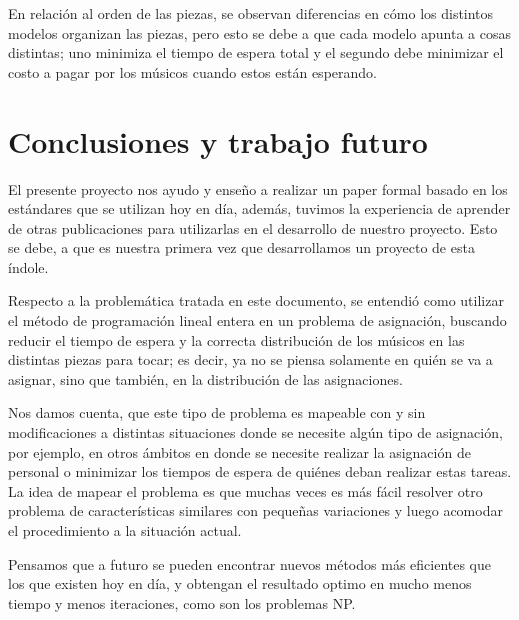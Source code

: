 \documentclass[journal, 10pt]{IEEEtran}
\begin{document}
	En relación al orden de las piezas, se observan diferencias en cómo los distintos modelos organizan las piezas, pero esto se debe a que cada modelo apunta a cosas distintas; uno minimiza el tiempo de espera total y el segundo debe minimizar el costo a pagar por los músicos cuando estos están esperando.


\section{Conclusiones y trabajo futuro}

El presente proyecto nos ayudo y enseño a realizar un paper formal basado en los estándares que se utilizan hoy en día, además, tuvimos la experiencia de aprender de otras publicaciones para utilizarlas en el desarrollo de nuestro proyecto. Esto se debe, a que es nuestra primera vez que desarrollamos un proyecto de esta índole.

Respecto a la problemática tratada en este documento, se entendió como utilizar el método de programación lineal entera en un problema de asignación, buscando reducir el tiempo de espera y la correcta distribución de los músicos en las distintas piezas para tocar; es decir, ya no se piensa solamente en quién se va a asignar, sino que también, en la distribución de las asignaciones.

Nos damos cuenta, que este tipo de problema es mapeable con y sin modificaciones a distintas situaciones donde se necesite algún tipo de asignación, por ejemplo, en otros ámbitos en donde se necesite realizar la asignación de personal o minimizar los tiempos de espera de quiénes deban realizar estas tareas. La idea de mapear el problema es que muchas veces es más fácil resolver otro problema de características similares con pequeñas variaciones y luego acomodar el procedimiento a la situación actual.

Pensamos que a futuro se pueden encontrar nuevos métodos más eficientes que los que existen hoy en día, y obtengan el resultado optimo en mucho menos tiempo y menos iteraciones, como son los problemas NP.




\end{document}
